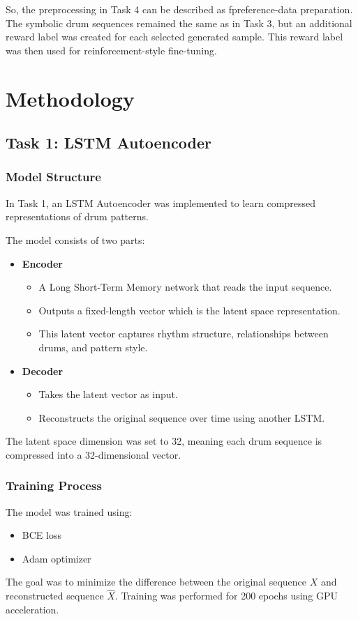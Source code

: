 \documentclass[conference]{IEEEtran}
\begin{document}
So, the preprocessing in Task 4 can be described as f{preference-data preparation}. The symbolic drum sequences remained the same as in Task 3, but an additional reward label was created for each selected generated sample. This reward label was then used for reinforcement-style fine-tuning.

\section{Methodology}

\subsection{Task 1: LSTM Autoencoder}

\subsubsection{Model Structure}
In Task 1, an LSTM Autoencoder was implemented to learn compressed representations of drum patterns.

The model consists of two parts:
\begin{itemize}
    \item \textbf{Encoder}
    \begin{itemize}
        \item A Long Short-Term Memory network that reads the input sequence.
        \item Outputs a fixed-length vector which is the latent space representation.
        \item This latent vector captures rhythm structure, relationships between drums, and pattern style.
    \end{itemize}
    \item \textbf{Decoder}
    \begin{itemize}
        \item Takes the latent vector as input.
        \item Reconstructs the original sequence over time using another LSTM.
    \end{itemize}
\end{itemize}
The latent space dimension was set to 32, meaning each drum sequence is compressed into a 32-dimensional vector.

\subsubsection{Training Process}
The model was trained using:
\begin{itemize}
    \item BCE loss
    \item Adam optimizer
\end{itemize}
The goal was to minimize the difference between the original sequence $X$ and reconstructed sequence $\hat{X}$. Training was performed for 200 epochs using GPU acceleration.
\end{document}

